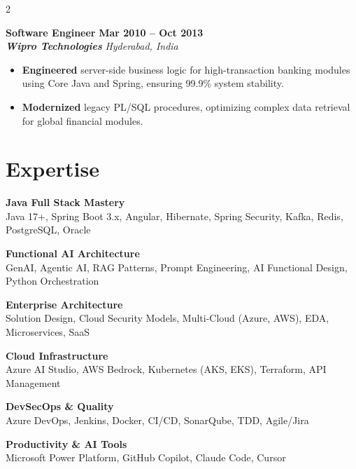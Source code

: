 \documentclass[10pt,a4paper]{article}
\newcommand{\job}[4]{
    \vspace{4pt} 
    \noindent
    {\small\bfseries\color{textgray} #1} \hfill {\footnotesize\bfseries #2} \\[1pt]
    {\scriptsize\textbf{\textit{\color{headerblue} #3}}} \hfill {\scriptsize\textit{#4}}
}
\begin{document}
\begin{paracol}{2}
\vspace{8pt} 
\job{Software Engineer}{Mar 2010 -- Oct 2013}{Wipro Technologies}{Hyderabad, India}
\begin{itemize}
    \item \textbf{Engineered} server-side business logic for high-transaction banking modules using Core Java and Spring, ensuring 99.9\% system stability.
    \item \textbf{Modernized} legacy PL/SQL procedures, optimizing complex data retrieval for global financial modules.
\end{itemize}

\switchcolumn
{}


\section*{\faCogs \hspace{4pt} Expertise}
\footnotesize
\textbf{Java Full Stack Mastery} \\
{\scriptsize Java 17+, Spring Boot 3.x, Angular, Hibernate, Spring Security, Kafka, Redis, PostgreSQL, Oracle}

\vspace{8pt}
\textbf{Functional AI Architecture} \\
{\scriptsize GenAI, Agentic AI, RAG Patterns, Prompt Engineering, AI Functional Design, Python Orchestration}

\vspace{8pt}
\textbf{Enterprise Architecture} \\
{\scriptsize Solution Design, Cloud Security Models, Multi-Cloud (Azure, AWS), EDA, Microservices, SaaS}

\vspace{8pt}
\textbf{Cloud Infrastructure} \\
{\scriptsize Azure AI Studio, AWS Bedrock, Kubernetes (AKS, EKS), Terraform, API Management}

\vspace{8pt}
\textbf{DevSecOps \& Quality} \\
{\scriptsize Azure DevOps, Jenkins, Docker, CI/CD, SonarQube, TDD, Agile/Jira}

\vspace{8pt}
\textbf{Productivity \& AI Tools} \\
{\scriptsize Microsoft Power Platform, GitHub Copilot, Claude Code, Cursor}


\end{paracol}
\end{document}
